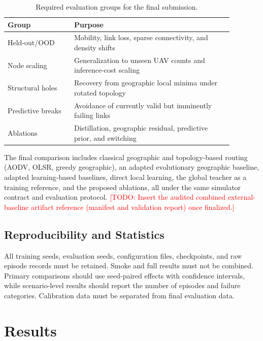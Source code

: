 \documentclass[preprint,12pt]{elsarticle}
\newcommand{\todo}[1]{\textcolor{red}{[TODO: #1]}}
\begin{document}
\begin{table}[t]
\centering
\caption{Required evaluation groups for the final submission.}
\label{tab:scenario-groups}
\begin{tabular}{p{0.26\linewidth}p{0.62\linewidth}}
\toprule
Group & Purpose \\
\midrule
Held-out/OOD & Mobility, link loss, sparse connectivity, and density shifts \\
Node scaling & Generalization to unseen UAV counts and inference-cost scaling \\
Structural holes & Recovery from geographic local minima under rotated topology \\
Predictive breaks & Avoidance of currently valid but imminently failing links \\
Ablations & Distillation, geographic residual, predictive prior, and switching \\
\bottomrule
\end{tabular}
\end{table}

The final comparison includes classical geographic and topology-based routing (AODV, OLSR, greedy geographic), an adapted evolutionary geographic baseline, adapted learning-based baselines, direct local learning, the global teacher as a training reference, and the proposed ablations, all under the same simulator contract and evaluation protocol. \todo{Insert the audited combined external-baseline artifact reference (manifest and validation report) once finalized.}

\subsection{Reproducibility and Statistics}

All training seeds, evaluation seeds, configuration files, checkpoints, and raw episode records must be retained. Smoke and full results must not be combined. Primary comparisons should use seed-paired effects with confidence intervals, while scenario-level results should report the number of episodes and failure categories. Calibration data must be separated from final evaluation data.

\section{Results}
\end{document}
